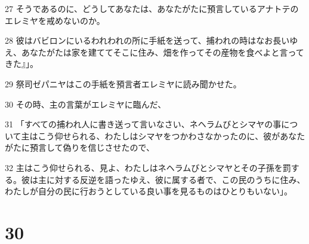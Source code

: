 \par 27 そうであるのに、どうしてあなたは、あなたがたに預言しているアナトテのエレミヤを戒めないのか。
\par 28 彼はバビロンにいるわれわれの所に手紙を送って、捕われの時はなお長いゆえ、あなたがたは家を建ててそこに住み、畑を作ってその産物を食べよと言ってきた』」。
\par 29 祭司ゼパニヤはこの手紙を預言者エレミヤに読み聞かせた。
\par 30 その時、主の言葉がエレミヤに臨んだ、
\par 31 「すべての捕われ人に書き送って言いなさい、ネヘラムびとシマヤの事について主はこう仰せられる、わたしはシマヤをつかわさなかったのに、彼があなたがたに預言して偽りを信じさせたので、
\par 32 主はこう仰せられる、見よ、わたしはネヘラムびとシマヤとその子孫を罰する。彼は主に対する反逆を語ったゆえ、彼に属する者で、この民のうちに住み、わたしが自分の民に行おうとしている良い事を見るものはひとりもいない」。

\chapter{30}

